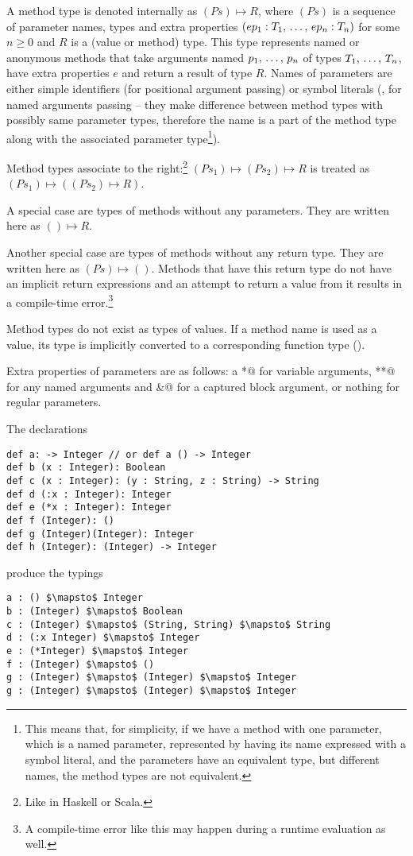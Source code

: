 A method type is denoted internally as $(Ps) \mapsto R$, where $(Ps)$ is a sequence of parameter names, types and extra properties $(ep_1 : T_1 ,\, \ldots ,\, ep_n : T_n)$ for some $n \geq 0$ and $R$ is a (value or method) type. This type represents named or anonymous methods that take arguments named $p_1 ,\, \ldots ,\, p_n$ of types $T_1 ,\, \ldots ,\, T_n$, have extra properties $e$ and return a result of type $R$. Names of parameters are either simple identifiers (for positional argument passing) or symbol literals (, for named arguments passing -- they make difference between method types with possibly same parameter types, therefore the name is a part of the method type along with the associated parameter type\footnote{This means that, for simplicity, if we have a method with one parameter, which is a named parameter, represented by having its name expressed with a symbol literal, and the parameters have an equivalent type, but different names, the method types are not equivalent.}). 

Method types associate to the right:\footnote{Like in Haskell or Scala.} \newline
$(Ps_1) \mapsto (Ps_2) \mapsto R$ is treated as $(Ps_1) \mapsto ((Ps_2) \mapsto R)$. 

A special case are types of methods without any parameters. They are written here as $() \mapsto R$. 

Another special case are types of methods without any return type. They are written here as $(Ps) \mapsto ()$. Methods that have this return type do not have an implicit return expressions and an attempt to return a value from it results in a compile-time error.\footnote{A compile-time error like this may happen during a runtime evaluation as well.}

Method types do not exist as types of values. If a method name is used as a value, its type is implicitly converted to a corresponding function type (). 

Extra properties of parameters are as follows: a \lstinline@*@ for variable arguments, \lstinline@**@ for any named arguments and \lstinline@&@ for a captured block argument, or nothing for regular parameters. 

\example The declarations
\begin{lstlisting}
def a: -> Integer // or def a () -> Integer
def b (x : Integer): Boolean
def c (x : Integer): (y : String, z : String) -> String
def d (:x : Integer): Integer
def e (*x : Integer): Integer
def f (Integer): ()
def g (Integer)(Integer): Integer
def h (Integer): (Integer) -> Integer
\end{lstlisting}
produce the typings
\begin{lstlisting}
a : () $\mapsto$ Integer
b : (Integer) $\mapsto$ Boolean
c : (Integer) $\mapsto$ (String, String) $\mapsto$ String
d : (:x Integer) $\mapsto$ Integer
e : (*Integer) $\mapsto$ Integer
f : (Integer) $\mapsto$ ()
g : (Integer) $\mapsto$ (Integer) $\mapsto$ Integer
g : (Integer) $\mapsto$ (Integer) $\mapsto$ Integer
\end{lstlisting}

